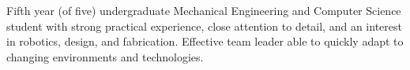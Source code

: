 
\begin{center}
	\begin{minipage}[t]{0.90\textwidth}
		Fifth year (of five) undergraduate Mechanical Engineering and Computer Science student with strong practical experience, close attention to detail, and an interest in robotics, design, and fabrication. Effective team leader able to quickly adapt to changing environments and technologies.
	\end{minipage}
\end{center}